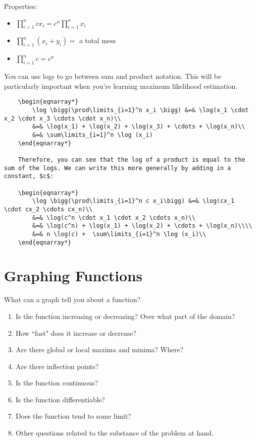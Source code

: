 \documentclass[]{book}
\theoremstyle{definition}
\theoremstyle{definition}
\theoremstyle{definition}
\theoremstyle{remark}
\begin{document}
Properties:

\begin{itemize}
\item $\prod\limits_{i=1}^n c x_i = c^n \prod\limits_{i=1}^n x_i $
\item $\prod\limits_{i=1}^n (x_i + y_i) =$ a total mess
\item $\prod\limits_{i=1}^n c = c^n $
\end{itemize}

You can use logs to go between sum and product notation. This will be
particularly important when you're learning maximum likelihood
estimation.

\begin{verbatim}
    \begin{eqnarray*}
        \log \bigg(\prod\limits_{i=1}^n x_i \bigg) &=& \log(x_1 \cdot x_2 \cdot x_3 \cdots \cdot x_n)\\
        &=& \log(x_1) + \log(x_2) + \log(x_3) + \cdots + \log(x_n)\\
        &=& \sum\limits_{i=1}^n \log (x_i)
    \end{eqnarray*}
    
    Therefore, you can see that the log of a product is equal to the sum of the logs. We can write this more generally by adding in a constant, $c$:
    
    \begin{eqnarray*}
        \log \bigg(\prod\limits_{i=1}^n c x_i\bigg) &=& \log(cx_1 \cdot cx_2 \cdots cx_n)\\
        &=& \log(c^n \cdot x_1 \cdot x_2 \cdots x_n)\\
        &=& \log(c^n) + \log(x_1) + \log(x_2) + \cdots + \log(x_n)\\\\
        &=& n \log(c) +  \sum\limits_{i=1}^n \log (x_i)\\
    \end{eqnarray*} 
\end{verbatim}

\section{Graphing Functions}\label{graphing-functions}

What can a graph tell you about a function?

\begin{enumerate}
        \item Is the function increasing or decreasing?  Over what part of the domain?
        \item How ``fast" does it increase or decrease?
        \item Are there global or local maxima and minima?  Where?
        \item Are there inflection points?
        \item Is the function continuous?
        \item Is the function differentiable?
        \item Does the function tend to some limit?
        \item Other questions related to the substance of the problem at hand.
    \end{enumerate}
\end{document}
